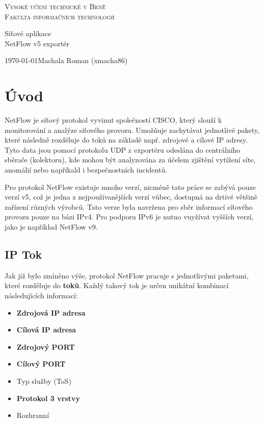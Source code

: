 \documentclass[11pt, a4paper, hidelinks]{article}[08.10.2023]
\begin{document}
\begin{titlepage}
    \begin{center}
        
        {\Huge \textsc{Vysoké učení technické v Brně}\\[0.5em]}
        {\huge \textsc{Fakulta informačních technologií}}
    
        {\LARGE Síťové aplikace\\[0.4em]
        NetFlow v5 exportér}
    
        {\Large \today \hfill {Machala Roman (xmacha86)}}
    \end{center}

\end{titlepage}

\tableofcontents
\pagebreak

\section{Úvod}
    NetFlow je síťový protokol vyvinut společností CISCO, který slouží k monitorování a analýze síťového provozu.
    Umožňuje zachytávat jednotlivé pakety, které následně rozděluje do toků na základě např. zdrojové a cílové IP adresy.
    Tyto data jsou pomocí protokolu UDP z exportéru odeslána do centrálního sběrače (kolektoru), kde
    mohou být analyzována za účelem zjištění vytížení síte, anomálií nebo napříkald i bezpečnostních incidentů\cite{Cisco_2019}.

    Pro protokol NetFlow existuje mnoho verzí, nicméně tato práce se 
    zabývá pouze verzí v5, což je jedna z nejpoužívanějších verzí vůbec, dostupná na drtivé většině
    zařízení různých výrobců. Tato verze byla navržena pro sběr informací síťového
    provozu pouze na bázi IPv4. Pro podporu IPv6 je nutno vuyžívat vyšších verzí, jako je například NetFlow v9\cite{ManageEngine}.

\subsection{IP Tok}\label{tok}
    Jak již bylo zmíněno výše, protokol NetFlow pracuje s jednotlivými paketami, které rozděluje do \textbf{toků}.
    Každý takový tok je určen unikátní kombinací následujících informací:
    \begin{itemize}
        \item{\textbf{Zdrojová IP adresa}}
        \item{\textbf{Cílová IP adresa}}
        \item{\textbf{Zdrojový PORT}}
        \item{\textbf{Cílový PORT}}
        \item{Typ služby (ToS)}
        \item{\textbf{Protokol 3 vrstvy}}
        \item{Rozhranní}
    \end{itemize}
\end{document}
